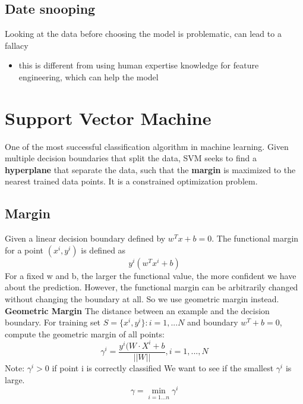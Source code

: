 \documentclass[11pt]{article}
\begin{document}
\subsection{Date snooping}
\label{sec:orgde1dd89}
Looking at the data before choosing the model is problematic, can lead to a fallacy 
\begin{itemize}
\item this is different from using human expertise knowledge for feature engineering, which can help the model
\end{itemize}

\section{Support Vector Machine}
\label{sec:orgdcf745a}
One of the most successful classification algorithm in machine learning. Given multiple decision boundaries that split the data, SVM seeks to find a \textbf{\textbf{hyperplane}} that separate the data, such that the \textbf{\textbf{margin}} is maximized to the nearest trained data points. It is a constrained optimization problem.
\subsection{Margin}
\label{sec:orge28ee49}
Given a linear decision boundary defined by \(w^Tx+b=0\). The functional margin for a point \((x^i, y^i)\) is defined as
$$
y^i(w^Tx^i + b)
$$
For a fixed w and b, the larger the functional value, the more confident we have about the prediction. However, the functional margin can be arbitrarily changed without changing the boundary at all. So we use geometric margin instead.
\textbf{\textbf{Geometric Margin}}
The distance between an example and the decision boundary.
For training set \(S=\{x^i, y^i\}: i = 1, ... N\) and boundary \(w^T+ b = 0\), compute the geometric margin of all points: 
$$\gamma^i = \frac{y^i(W \cdot X^i + b}{||W||}, i = 1, ..., N$$
Note: \(\gamma^i > 0\) if point i is correctly classified
We want to see if the smallest \(\gamma^i\) is large. 
$$\gamma =\min_{i=1...n} \gamma^i$$
\end{document}
